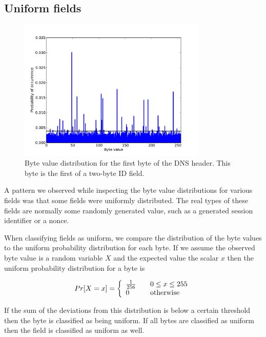 \documentclass[a4paper]{report}
\begin{document}
\newpage

\subsection{Uniform fields}
\begin{figure}[h]
    \centering
    \includegraphics[width=0.8\textwidth]{img/uniform}
    \captionsetup{width=0.8\textwidth}
    \caption{Byte value distribution for the first byte of the DNS header.
        This byte is the first of a two-byte ID field.}
    \label{fig:uniform}
\end{figure}

A pattern we observed while inspecting the byte value distributions for
various fields was that some fields were uniformly distributed. The real
types of these fields are normally some randomly generated value, such as
a generated session identifier or a nonce.

When classifying fields as uniform, we compare the distribution of the byte
values to the uniform probability distribution for each byte. If we assume the
observed byte value is a random variable $X$ and the expected value the scalar
$x$ then the uniform probability distribution for a byte is

\[
    Pr[X = x] = \left\{
        \begin{array}{l l}
            \frac{1}{256} & \quad 0 \le x \le 255 \\
            0 & \quad \text{otherwise}
        \end{array}
    \right.
\]

If the sum of the deviations from this distribution is below a certain
threshold then the byte is classified as being uniform. If all bytes are
classified as uniform then the field is classified as uniform as well.
\end{document}

